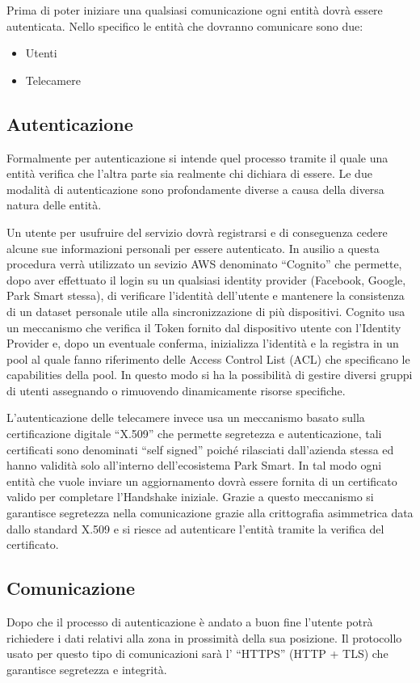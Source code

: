 Prima di poter iniziare una qualsiasi comunicazione ogni entità dovrà essere autenticata. Nello specifico le entità che dovranno comunicare sono due:

\begin{itemize}
	\item Utenti
	\item Telecamere
\end{itemize}

\subsection*{Autenticazione} 
Formalmente per autenticazione si intende quel processo tramite il quale una entità verifica che l'altra parte sia realmente chi dichiara di essere.
Le due modalità di autenticazione sono profondamente diverse a causa della diversa natura delle entità. 

Un utente per usufruire del servizio dovrà registrarsi e di conseguenza cedere alcune sue informazioni personali per essere autenticato. 
In ausilio a questa procedura verrà utilizzato un sevizio AWS denominato ``Cognito'' che permette, dopo aver effettuato il login su un qualsiasi identity provider (Facebook, Google, Park Smart stessa), di verificare l'identità dell'utente e mantenere la consistenza di un dataset personale utile alla sincronizzazione di più dispositivi. 
Cognito usa un meccanismo che verifica il Token fornito dal dispositivo utente con l'Identity Provider e, dopo un eventuale conferma, inizializza l'identità e la registra in un pool al quale fanno riferimento delle Access Control List (ACL) che specificano le capabilities della pool. In questo modo si ha la possibilità di gestire diversi gruppi di utenti assegnando o rimuovendo dinamicamente risorse specifiche.

L'autenticazione delle telecamere invece usa un meccanismo basato sulla certificazione digitale ``X.509'' che permette segretezza e autenticazione, tali certificati sono denominati ``self signed'' poiché rilasciati dall'azienda stessa ed hanno validità solo all'interno dell'ecosistema Park Smart. 
In tal modo ogni entità che vuole inviare un aggiornamento dovrà essere fornita di un certificato valido per completare l'Handshake iniziale. 
Grazie a questo meccanismo si garantisce segretezza nella comunicazione grazie alla crittografia asimmetrica data dallo standard X.509 e si riesce ad autenticare l'entità tramite la verifica del certificato.

\subsection*{Comunicazione}
Dopo che il processo di autenticazione è andato a buon fine l'utente potrà richiedere i dati relativi alla zona in prossimità della sua posizione. Il protocollo usato per questo tipo di comunicazioni sarà l' ``HTTPS'' (HTTP + TLS) che garantisce segretezza e integrità.

